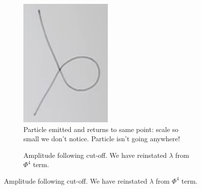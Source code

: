 \documentclass[]{article}
\begin{document}
\begin{figure}[H]
	\caption{Mimicking the Vertex}\label{fig:mimicking:vertex}
	\begin{subfigure}[t]{0.32\textwidth}
		\caption{Particle emitted and returns to same point: scale so small we don't notice. Particle isn't going anywhere!}\label{fig:3-1-feynman-mimic}
		\includegraphics[width=\textwidth]{3-1-feynman-mimic}
	\end{subfigure}
	\begin{subfigure}[t]{0.32\textwidth}
		\caption{Amplitude following cut-off. We have reinstated $\lambda$ from $\Phi^4$ term.}\label{fig:3-1-cutoff}

\end{subfigure}
\end{figure}
\end{document}
